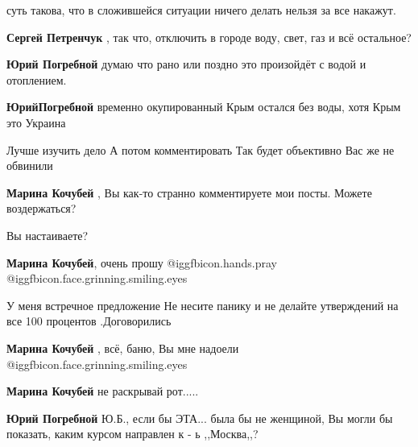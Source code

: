  
 
 
 
 
\zzSecCmt

\begin{itemize} %

суть такова, что в сложившейся ситуации ничего делать нельзя за все накажут.

\begin{itemize} %
\textbf{Сергей Петренчук} , так что, отключить в городе воду, свет, газ и всё остальное?

\textbf{Юрий Погребной} думаю что рано или поздно это произойдёт с водой и отоплением.

\textbf{ЮрийПогребной} временно окупированный Крым остался без воды, хотя Крым это Украина
\end{itemize} %

Лучше изучить дело А потом комментировать Так будет объективно Вас же не обвинили

\begin{itemize} %
\textbf{Марина Кочубей} , Вы как-то странно комментируете мои посты. Можете воздержаться?

Вы настаиваете?

\textbf{Марина Кочубей}, очень прошу  @igg{fbicon.hands.pray}  @igg{fbicon.face.grinning.smiling.eyes} 


У меня встречное предложение Не несите панику и не делайте утверждений на все
100 процентов .Договорились

\textbf{Марина Кочубей} , всё, баню, Вы мне надоели  @igg{fbicon.face.grinning.smiling.eyes} 

\textbf{Марина Кочубей} не раскрывай рот.....

\textbf{Юрий Погребной} Ю.Б., если бы ЭТА... была бы не женщиной, Вы могли бы показать, каким курсом направлен к - ь ,,Москва,,?
\end{itemize} %


\end{itemize}
